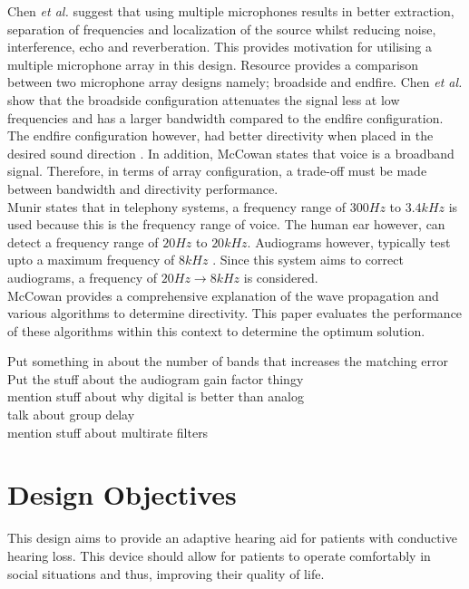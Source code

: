 \documentclass[11pt,onecolumn]{witseiepaper}
\begin{document}
\newline
\noindent Chen \textit{et al.} \cite{present} suggest that using multiple microphones results in better extraction, separation of frequencies and localization of the source whilst reducing noise, interference, echo and reverberation. This provides motivation for utilising a multiple microphone array in this design. Resource \cite{broadEnd} provides a comparison between two microphone array designs namely; broadside and endfire. Chen \textit{et al.} show that the broadside configuration attenuates the signal less at low frequencies and has a larger bandwidth compared to the endfire configuration. The endfire configuration however, had better directivity when placed in the desired sound direction \cite{broadEnd}. In addition, McCowan \cite{mccowan} states that voice is a broadband signal. Therefore, in terms of array configuration, a trade-off must be made between bandwidth and directivity performance.  \\
\newline
\noindent Munir \cite{munir} states that in telephony systems, a frequency range of $300Hz$ to $3.4kHz$ is used because this is the frequency range of voice. The human ear however, can detect a frequency range of $20Hz$ to $20kHz$. Audiograms however, typically test upto a maximum frequency of $8kHz$ \cite{audioMaxFreq}. Since this system aims to correct audiograms, a frequency of $20Hz \rightarrow 8kHz$ is considered.\\
\newline
\noindent McCowan \cite{mccowan} provides a comprehensive explanation of the wave propagation and various algorithms to determine directivity. This paper evaluates the performance of these algorithms within this context to determine the optimum solution.\\
\newline

Put something in about the number of bands that increases the matching error
Put the stuff about the audiogram gain factor thingy\\
mention stuff about why digital is better than analog\\
talk about group delay\\
mention stuff about multirate filters
\section{Design Objectives}

\noindent This design aims to provide an adaptive hearing aid for patients with conductive hearing loss. This device should allow for patients to operate comfortably in social situations and thus, improving their quality of life.
\end{document}
